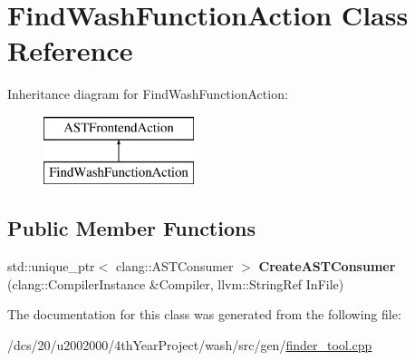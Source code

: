 \hypertarget{classFindWashFunctionAction}{}\section{Find\+Wash\+Function\+Action Class Reference}
\label{classFindWashFunctionAction}
Inheritance diagram for Find\+Wash\+Function\+Action\+:\begin{figure}[H]
\begin{center}
\leavevmode
\includegraphics[height=2.000000cm]{classFindWashFunctionAction}
\end{center}
\end{figure}
\subsection*{Public Member Functions}
\begin{DoxyCompactItemize}
\item 
\mbox{\label{classFindWashFunctionAction_a1e49f05e07b1794e456beb4afb203de5}} 
std\+::unique\+\_\+ptr$<$ clang\+::\+A\+S\+T\+Consumer $>$ {\bfseries Create\+A\+S\+T\+Consumer} (clang\+::\+Compiler\+Instance \&Compiler, llvm\+::\+String\+Ref In\+File)
\end{DoxyCompactItemize}


The documentation for this class was generated from the following file\+:\begin{DoxyCompactItemize}
\item 
/dcs/20/u2002000/4th\+Year\+Project/wash/src/gen/\mbox{\hyperlink{finder__tool_8cpp}{finder\+\_\+tool.\+cpp}}\end{DoxyCompactItemize}

